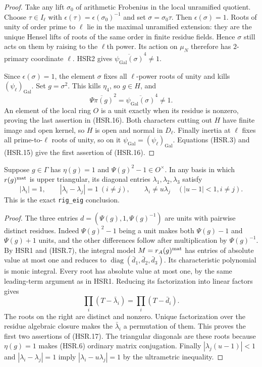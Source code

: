 \begin{proof}
Take any lift $\sigma_0$ of arithmetic Frobenius in the local
unramified quotient.  Choose $\tau\in I_\ell$ with
$\epsilon(\tau)=\epsilon(\sigma_0)^{-1}$ and set
$\sigma=\sigma_0\tau$.  Then $\epsilon(\sigma)=1$.
Roots of unity of order prime to $\ell$ lie in the maximal
unramified extension: they are the unique Hensel lifts of roots
of the same order in finite residue fields.  Hence $\sigma$
still acts on them by raising to the $\ell$th power.  Its action
on $\mu_N$ therefore has $2$-primary coordinate $\ell$.
HSR2 gives $\overline{\psi_{\mathrm{Gal}}(\sigma)}^4\ne1$.

Since $\epsilon(\sigma)=1$, the element $\sigma$ fixes all
$\ell$-power roots of unity and kills $(\psi_\ell)_{\mathrm{Gal}}$.
Set $g=\sigma^2$.  This kills $\eta_4$, so $g\in H$, and
\[
 \overline{\Psi\pi(g)}^2
   =\overline{\psi_{\mathrm{Gal}}(\sigma)}^4\ne1.
\]
An element of the local ring $O$ is a unit exactly when its residue
is nonzero, proving the last assertion in (HSR.16).
Both characters cutting out $H$ have finite image and open kernel,
so $H$ is open and normal in $D_\ell$.  Finally inertia at $\ell$
fixes all prime-to-$\ell$ roots of unity, so on it
$\psi_{\mathrm{Gal}}=(\psi_\ell)_{\mathrm{Gal}}$.
Equations (HSR.3) and (HSR.15) give the first assertion of
(HSR.16).
\end{proof}

\begin{lemma}
\label{claim:HSR4}
Suppose $g\in\Gamma$ has $\eta(g)=1$ and
$\Psi(g)^2-1\in O^\times$.  In any basis in which $r(g)^{\rm mat}$
is upper triangular, its diagonal entries $\lambda_1,\lambda_2,
\lambda_3$ satisfy
\[
 |\lambda_i|=1,\qquad |\lambda_i-\lambda_j|=1\ (i\ne j),
 \qquad \lambda_i\ne u\lambda_j\quad(|u-1|<1, i\ne j).
 \tag{HSR.17}
\]
This is the exact \texttt{rig\_eig} conclusion.
\end{lemma}
\begin{proof}
The three entries $d=(\Psi(g),1,\Psi(g)^{-1})$ are units with
pairwise distinct residues.  Indeed $\Psi(g)^2-1$ being a unit
makes both $\Psi(g)-1$ and $\Psi(g)+1$ units, and the other
differences follow after multiplication by $\Psi(g)^{-1}$.
By HSR1 and (HSR.7), the integral model $M=r_A(g)^{\rm mat}$
has entries of absolute value at most one and reduces to
$\operatorname{diag}(\bar d_1,\bar d_2,\bar d_3)$.
Its characteristic polynomial is monic integral.  Every root has
absolute value at most one, by the same leading-term argument as
in HSR1.  Reducing its factorization into linear factors gives
\[
 \prod_i(T-\bar\lambda_i)=\prod_i(T-\bar d_i).
\]
The roots on the right are distinct and nonzero.  Unique
factorization over the residue algebraic closure makes the
$\bar\lambda_i$ a permutation of them.  This proves the first
two assertions of (HSR.17).  The triangular diagonals are these
roots because $\eta(g)=1$ makes (HSR.6) ordinary matrix
conjugation.  Finally $|\lambda_j(u-1)|<1$ and
$|\lambda_i-\lambda_j|=1$ imply
$|\lambda_i-u\lambda_j|=1$ by the ultrametric inequality.
\end{proof}

